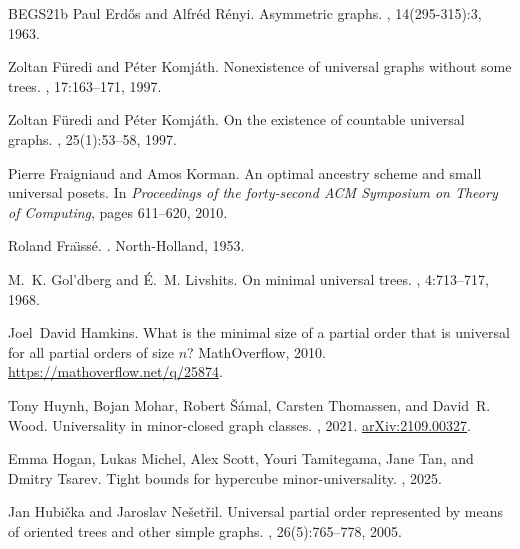 \documentclass[11pt]{article}
\newcommand{\1}{\mathbbm{1}}
\begin{document}
\begin{thebibliography}{BEGS21b}
Paul Erd\H{o}s and Alfr{\'e}d R{\'e}nyi.
\newblock Asymmetric graphs.
, 14(295-315):3, 1963.

Zoltan F{\"u}redi and P{\'e}ter Komj{\'a}th.
\newblock Nonexistence of universal graphs without some trees.
, 17:163--171, 1997.

Zoltan F{\"u}redi and P{\'e}ter Komj{\'a}th.
\newblock On the existence of countable universal graphs.
, 25(1):53--58, 1997.

Pierre Fraigniaud and Amos Korman.
\newblock An optimal ancestry scheme and small universal posets.
\newblock In {\em Proceedings of the forty-second ACM Symposium on Theory of Computing}, pages 611--620, 2010.

Roland Fra{\"\i}ss{\'e}.
.
\newblock North-Holland, 1953.

M.~K. Gol'dberg and É.~M. Livshits.
\newblock On minimal universal trees.
, 4:713--717, 1968.

Joel~David Hamkins.
\newblock What is the minimal size of a partial order that is universal for all partial orders of size $n$?
\newblock MathOverflow, 2010.
\newblock \url{https://mathoverflow.net/q/25874}.

Tony Huynh, Bojan Mohar, Robert {\v{S}}{\'a}mal, Carsten Thomassen, and David~R. Wood.
\newblock Universality in minor-closed graph classes.
, 2021.
\newblock \href{https://arxiv.org/abs/2109.00327}{arXiv:2109.00327}.

Emma Hogan, Lukas Michel, Alex Scott, Youri Tamitegama, Jane Tan, and Dmitry Tsarev.
\newblock Tight bounds for hypercube minor-universality.
, 2025.

Jan Hubi{\v{c}}ka and Jaroslav Ne{\v{s}}et{\v{r}}il.
\newblock Universal partial order represented by means of oriented trees and other simple graphs.
, 26(5):765--778, 2005.


\end{thebibliography}
\end{document}
